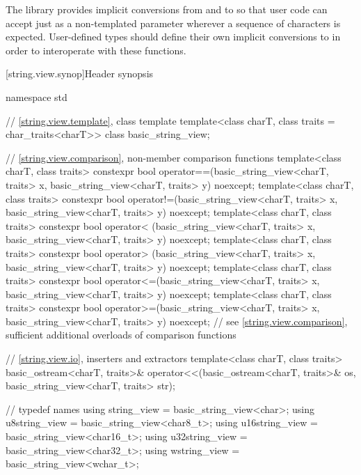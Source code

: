 \pnum
\begin{note}
The library provides implicit conversions from  and  to  so that user code can accept just  as a non-templated parameter wherever a sequence of characters is expected.
User-defined types should define their own implicit conversions to  in order to interoperate with these functions.
\end{note}

[string.view.synop]{Header  synopsis}

%
\begin{codeblock}
namespace std {
  // \ref{string.view.template}, class template 
  template<class charT, class traits = char_traits<charT>>
  class basic_string_view;

  // \ref{string.view.comparison}, non-member comparison functions
  template<class charT, class traits>
    constexpr bool operator==(basic_string_view<charT, traits> x,
                              basic_string_view<charT, traits> y) noexcept;
  template<class charT, class traits>
    constexpr bool operator!=(basic_string_view<charT, traits> x,
                              basic_string_view<charT, traits> y) noexcept;
  template<class charT, class traits>
    constexpr bool operator< (basic_string_view<charT, traits> x,
                              basic_string_view<charT, traits> y) noexcept;
  template<class charT, class traits>
    constexpr bool operator> (basic_string_view<charT, traits> x,
                              basic_string_view<charT, traits> y) noexcept;
  template<class charT, class traits>
    constexpr bool operator<=(basic_string_view<charT, traits> x,
                              basic_string_view<charT, traits> y) noexcept;
  template<class charT, class traits>
    constexpr bool operator>=(basic_string_view<charT, traits> x,
                              basic_string_view<charT, traits> y) noexcept;
  // see \ref{string.view.comparison}, sufficient additional overloads of comparison functions

  // \ref{string.view.io}, inserters and extractors
  template<class charT, class traits>
    basic_ostream<charT, traits>&
      operator<<(basic_ostream<charT, traits>& os,
                 basic_string_view<charT, traits> str);

  //  typedef names
  using string_view    = basic_string_view<char>;
  using u8string_view  = basic_string_view<char8_t>;
  using u16string_view = basic_string_view<char16_t>;
  using u32string_view = basic_string_view<char32_t>;
  using wstring_view   = basic_string_view<wchar_t>;

}
\end{codeblock}
